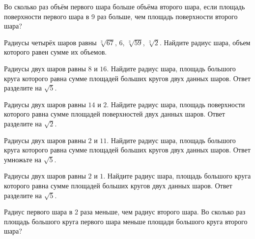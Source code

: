 \documentclass[a4paper]{article}
\begin{document}
\begin{taskBN}{73}
Во сколько раз объём первого шара больше объёма второго шара, если площадь поверхности первого шара в 9 раз больше, чем площадь поверхности второго шара?
\end{taskBN}

\begin{taskBN}{74}
Радиусы четырёх шаров равны $\sqrt[3]{67}$, $6$, $\sqrt[3]{59}$, $\sqrt[3]{2}$. Найдите радиус шара, объем которого равен сумме их объемов.
\end{taskBN}

\begin{taskBN}{75}
Радиусы двух шаров равны $8$ и $16$. Найдите радиус шара, площадь большого круга которого равна сумме площадей больших кругов двух данных шаров. Ответ разделите на $\sqrt{5}$.
\end{taskBN}

\begin{taskBN}{76}
Радиусы двух шаров равны $14$ и $2$. Найдите радиус шара, площадь поверхности которого равна сумме площадей поверхностей двух данных шаров. Ответ разделите на $\sqrt{2}$.
\end{taskBN}

\begin{taskBN}{77}
Радиусы двух шаров равны $2$ и $11$. Найдите радиус шара, площадь большого круга которого равна сумме площадей больших кругов двух данных шаров. Ответ умножьте на $\sqrt{5}$.
\end{taskBN}

\begin{taskBN}{78}
Радиусы двух шаров равны $2$ и $1$. Найдите радиус шара, площадь большого круга которого равна сумме площадей больших кругов двух данных шаров. Ответ разделите на $\sqrt{5}$.
\end{taskBN}

\begin{taskBN}{79}
Радиус первого шара в 2 раза меньше, чем радиус второго шара. Во сколько раз площадь большого круга первого шара меньше площади большого круга второго шара?
\end{taskBN}
\end{document}
